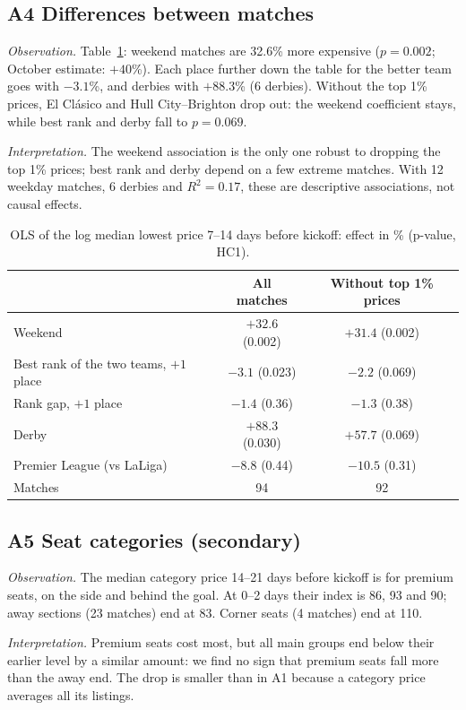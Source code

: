 \documentclass[11pt,a4paper]{article}
\newcommand{\eur}{\texteuro}
\newcommand{\obs}{\par\noindent\textit{Observation.} }
\newcommand{\interp}{\par\noindent\textit{Interpretation.} }
\begin{document}
\subsection*{A4 Differences between matches}
\obs Table~\ref{tab:a4}: weekend matches are 32.6\% more expensive ($p=0.002$; October estimate: $+40$\%). Each place further down the table for the better team goes with $-3.1$\%, and derbies with $+88.3$\% (6 derbies). Without the top 1\% prices, El Cl\'asico and Hull City--Brighton drop out: the weekend coefficient stays, while best rank and derby fall to $p=0.069$.
\interp The weekend association is the only one robust to dropping the top 1\% prices; best rank and derby depend on a few extreme matches. With 12 weekday matches, 6 derbies and $R^2=0.17$, these are descriptive associations, not causal effects.

\begin{table}[htbp]
\centering
\caption{OLS of the log median lowest price 7--14 days before kickoff: effect in \% (p-value, HC1).}
\label{tab:a4}
\begin{tabular}{lcc}
\toprule
 & All matches & Without top 1\% prices \\
\midrule
Weekend & $+32.6$ (0.002) & $+31.4$ (0.002) \\
Best rank of the two teams, $+1$ place & $-3.1$ (0.023) & $-2.2$ (0.069) \\
Rank gap, $+1$ place & $-1.4$ (0.36) & $-1.3$ (0.38) \\
Derby & $+88.3$ (0.030) & $+57.7$ (0.069) \\
Premier League (vs LaLiga) & $-8.8$ (0.44) & $-10.5$ (0.31) \\
\midrule
Matches & 94 & 92 \\
\bottomrule
\end{tabular}
\end{table}

\subsection*{A5 Seat categories (secondary)}
\obs The median category price 14--21 days before kickoff is \eur 547 for premium seats, \eur 344 on the side and \eur 288 behind the goal. At 0--2 days their index is 86, 93 and 90; away sections (23 matches) end at 83. Corner seats (4 matches) end at 110.
\interp Premium seats cost most, but all main groups end below their earlier level by a similar amount: we find no sign that premium seats fall more than the away end. The drop is smaller than in A1 because a category price averages all its listings.
\end{document}
